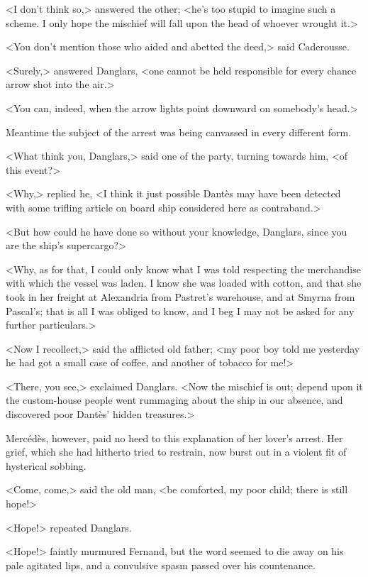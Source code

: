  <I don't think so,> answered the other; <he's too stupid to imagine such a scheme. I only hope the mischief will fall upon the head of whoever wrought it.> 

 <You don't mention those who aided and abetted the deed,> said Caderousse. 

 <Surely,> answered Danglars, <one cannot be held responsible for every chance arrow shot into the air.> 

 <You can, indeed, when the arrow lights point downward on somebody's head.> 

 Meantime the subject of the arrest was being canvassed in every different form. 

 <What think you, Danglars,> said one of the party, turning towards him, <of this event?> 

 <Why,> replied he, <I think it just possible Dantès may have been detected with some trifling article on board ship considered here as contraband.> 

 <But how could he have done so without your knowledge, Danglars, since you are the ship's supercargo?> 

 <Why, as for that, I could only know what I was told respecting the merchandise with which the vessel was laden. I know she was loaded with cotton, and that she took in her freight at Alexandria from Pastret's warehouse, and at Smyrna from Pascal's; that is all I was obliged to know, and I beg I may not be asked for any further particulars.> 

 <Now I recollect,> said the afflicted old father; <my poor boy told me yesterday he had got a small case of coffee, and another of tobacco for me!> 

 <There, you see,> exclaimed Danglars. <Now the mischief is out; depend upon it the custom-house people went rummaging about the ship in our absence, and discovered poor Dantès' hidden treasures.> 

 Mercédès, however, paid no heed to this explanation of her lover's arrest. Her grief, which she had hitherto tried to restrain, now burst out in a violent fit of hysterical sobbing. 

 <Come, come,> said the old man, <be comforted, my poor child; there is still hope!> 

 <Hope!> repeated Danglars. 

 <Hope!> faintly murmured Fernand, but the word seemed to die away on his pale agitated lips, and a convulsive spasm passed over his countenance. 

